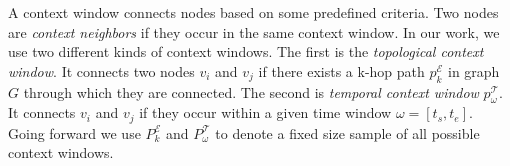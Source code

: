 \begin{secDefinition}
A context window connects nodes based on some predefined criteria. Two nodes are \textit{context neighbors} if they occur in the same context window.
In our work, we use two different kinds of context windows. 
The first is the \textit{topological context window}. It connects two nodes $v_i$ and $v_j$ if there exists a k-hop path ${p}^{\mathcal{E}}_k$ in graph $G$ through which they are connected.
The second is \textit{temporal context window} ${p}^{\mathcal{T}}_{\omega}$. 
It connects $v_i$ and $v_j$ if they occur within a given time window $\omega = [t_s, t_e]$.
Going forward we use ${P}^{\mathcal{E}}_k$ and ${P}^{\mathcal{T}}_{\omega}$ to denote a fixed size sample of all possible context windows. 
\end{secDefinition}

